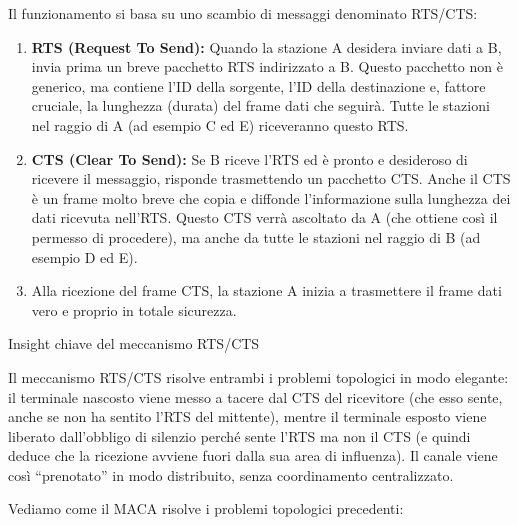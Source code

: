 \documentclass[
  italian,
  openany]{book}
\begin{document}
Il funzionamento si basa su uno scambio di messaggi denominato RTS/CTS:

\begin{enumerate}
\def\labelenumi{\arabic{enumi}.}
\item
  \textbf{RTS (Request To Send):} Quando la stazione A desidera inviare
  dati a B, invia prima un breve pacchetto RTS indirizzato a B. Questo
  pacchetto non è generico, ma contiene l'ID della sorgente, l'ID della
  destinazione e, fattore cruciale, la lunghezza (durata) del frame dati
  che seguirà. Tutte le stazioni nel raggio di A (ad esempio C ed E)
  riceveranno questo RTS.
\item
  \textbf{CTS (Clear To Send):} Se B riceve l'RTS ed è pronto e
  desideroso di ricevere il messaggio, risponde trasmettendo un
  pacchetto CTS. Anche il CTS è un frame molto breve che copia e
  diffonde l'informazione sulla lunghezza dei dati ricevuta nell'RTS.
  Questo CTS verrà ascoltato da A (che ottiene così il permesso di
  procedere), ma anche da tutte le stazioni nel raggio di B (ad esempio
  D ed E).
\item
  Alla ricezione del frame CTS, la stazione A inizia a trasmettere il
  frame dati vero e proprio in totale sicurezza.
\end{enumerate}

\begin{callouttip}{Insight chiave del meccanismo RTS/CTS}

Il meccanismo RTS/CTS risolve entrambi i problemi topologici in modo
elegante: il terminale nascosto viene messo a tacere dal CTS del
ricevitore (che esso sente, anche se non ha sentito l'RTS del mittente),
mentre il terminale esposto viene liberato dall'obbligo di silenzio
perché sente l'RTS ma non il CTS (e quindi deduce che la ricezione
avviene fuori dalla sua area di influenza). Il canale viene così
``prenotato'' in modo distribuito, senza coordinamento centralizzato.

\end{callouttip}

Vediamo come il MACA risolve i problemi topologici precedenti:
\end{document}
